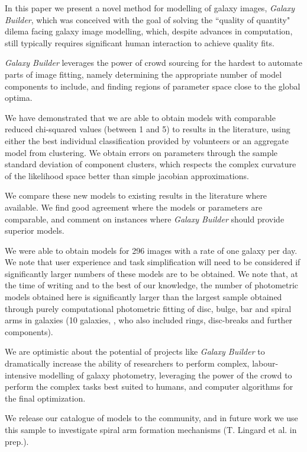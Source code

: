 \documentclass[../main.tex]{subfiles}
\begin{document}
\label{sec:conclusions}
In this paper we present a novel method for modelling of galaxy images, \textit{Galaxy Builder}, which was conceived with the goal of solving the ``quality of quantity" dilema facing galaxy image modelling, which, despite advances in computation, still typically requires significant human interaction to achieve quality fits.

\textit{Galaxy Builder} leverages the power of crowd sourcing for the hardest to automate parts of image fitting, namely determining the appropriate number of model components to include, and finding regions of parameter space close to the global optima.

We have demonstrated that we are able to obtain models with comparable reduced chi-squared values (between 1 and 5) to results in the literature, using either the best individual classification provided by volunteers or an aggregate model from clustering. We obtain errors on parameters through the sample standard deviation of component clusters, which respects the complex curvature of the likelihood space better than simple jacobian approximations.

We compare these new models to existing results in the literature where available. We find good agreement where the models or parameters are comparable, and comment on instances where \textit{Galaxy Builder} should provide superior models.

We were able to obtain models for 296 images with a rate of one galaxy per day. We note that user experience and task simplification will need to be considered if significantly larger numbers of these models are to be obtained. We note that, at the time of writing and to the best of our knowledge, the number of photometric models obtained here is significantly larger than the largest sample obtained through purely computational photometric fitting of disc, bulge, bar and spiral arms in galaxies (10 galaxies, \citealt{Gao2017:1709.00746v1}, who also included rings, disc-breaks and further components).

We are optimistic about the potential of projects like \textit{Galaxy Builder} to dramatically increase the ability of researchers to perform complex, labour-intensive modelling of galaxy photometry, leveraging the power of the crowd to perform the complex tasks best suited to humans, and computer algorithms for the final optimization.

We release our catalogue of models to the community, and in future work we use this sample to investigate spiral arm formation mechanisms (T. Lingard et al. in prep.).
\end{document}
